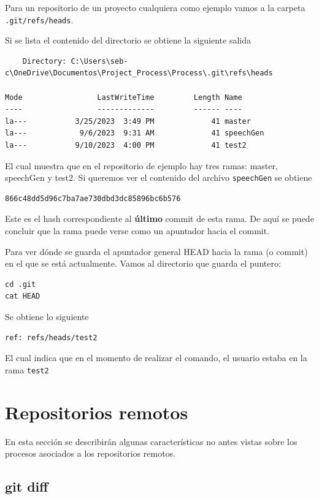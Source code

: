 Para un repositorio de un proyecto cualquiera como ejemplo vamos a la carpeta \texttt{.git/refs/heads}.

Si se lista el contenido del directorio se obtiene la siguiente salida

\begin{verbatim}
    Directory: C:\Users\seb-c\OneDrive\Documentos\Project_Process\Process\.git\refs\heads

Mode                 LastWriteTime         Length Name
----                 -------------         ------ ----
la---           3/25/2023  3:49 PM             41 master
la---            9/6/2023  9:31 AM             41 speechGen
la---           9/10/2023  4:00 PM             41 test2
\end{verbatim}

El cual muestra que en el repositorio de ejemplo hay tres ramas: master, speechGen y test2. Si queremos ver el contenido del archivo \texttt{speechGen} se obtiene

\begin{verbatim}
866c48dd5d96c7ba7ae730dbd3dc85896bc6b576
\end{verbatim}

Este es el hash correspondiente al \textbf{último} commit de esta rama. De aquí se puede concluir que la rama puede verse como un apuntador hacia el commit. 

Para ver dónde se guarda el apuntador general HEAD hacia la rama (o commit) en el que se está actualmente. Vamos al directorio que guarda el puntero: 

\begin{verbatim}
cd .git
cat HEAD
\end{verbatim}

Se obtiene lo siguiente


\begin{verbatim}
ref: refs/heads/test2
\end{verbatim}

El cual indica que en el momento de realizar el comando, el usuario estaba en la rama \texttt{test2}

\section{Repositorios remotos}

En esta sección se describirán algunas características no antes vistas sobre los procesos asociados a los repositorios remotos.

\subsection{git diff}

